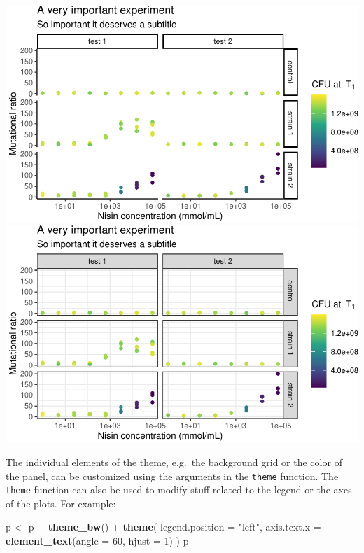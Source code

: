 \documentclass[]{book}
\newenvironment{Shaded}{}{}
\newcommand{\DataTypeTok}[1]{\textcolor[rgb]{0.56,0.13,0.00}{#1}}
\newcommand{\DecValTok}[1]{\textcolor[rgb]{0.25,0.63,0.44}{#1}}
\newcommand{\KeywordTok}[1]{\textcolor[rgb]{0.00,0.44,0.13}{\textbf{#1}}}
\newcommand{\NormalTok}[1]{#1}
\newcommand{\OperatorTok}[1]{\textcolor[rgb]{0.40,0.40,0.40}{#1}}
\newcommand{\StringTok}[1]{\textcolor[rgb]{0.25,0.44,0.63}{#1}}
\begin{document}
\begin{center}\includegraphics[width=\textwidth]{TRES-Tidy-Tutorial_files/figure-latex/unnamed-chunk-144-1} \includegraphics[width=\textwidth]{TRES-Tidy-Tutorial_files/figure-latex/unnamed-chunk-144-2} \end{center}

The individual elements of the theme, e.g.~the background grid or the color of the panel, can be customized using the arguments in the \texttt{theme} function. The \texttt{theme} function can also be used to modify stuff related to the legend or the axes of the plots. For example:

\begin{Shaded}
\begin{Highlighting}[]
\NormalTok{p <-}\StringTok{ }\NormalTok{p }\OperatorTok{+}\StringTok{ }
\StringTok{  }\KeywordTok{theme_bw}\NormalTok{() }\OperatorTok{+}
\StringTok{  }\KeywordTok{theme}\NormalTok{(}
    \DataTypeTok{legend.position =} \StringTok{"left"}\NormalTok{, }
    \DataTypeTok{axis.text.x =} \KeywordTok{element_text}\NormalTok{(}\DataTypeTok{angle =} \DecValTok{60}\NormalTok{, }\DataTypeTok{hjust =} \DecValTok{1}\NormalTok{)}
\NormalTok{  )}
\NormalTok{p}
\end{Highlighting}
\end{Shaded}
\end{document}

